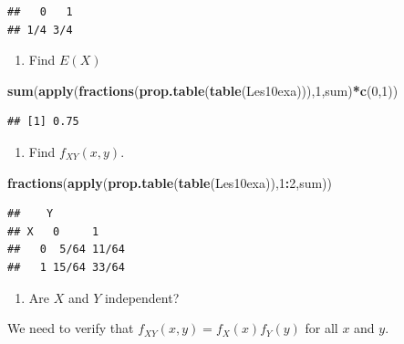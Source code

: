 \documentclass[]{book}
\newenvironment{Shaded}{\begin{snugshade}}{\end{snugshade}}
\newcommand{\KeywordTok}[1]{\textcolor[rgb]{0.13,0.29,0.53}{\textbf{#1}}}
\newcommand{\DecValTok}[1]{\textcolor[rgb]{0.00,0.00,0.81}{#1}}
\newcommand{\OperatorTok}[1]{\textcolor[rgb]{0.81,0.36,0.00}{\textbf{#1}}}
\newcommand{\NormalTok}[1]{#1}
\providecommand{\tightlist}{%
  \setlength{\itemsep}{0pt}\setlength{\parskip}{0pt}}
\theoremstyle{definition}
\theoremstyle{definition}
\theoremstyle{definition}
\theoremstyle{remark}
\begin{document}
\begin{verbatim}
##   0   1 
## 1/4 3/4
\end{verbatim}

\begin{enumerate}
\def\labelenumi{\arabic{enumi}.}
\setcounter{enumi}{2}
\tightlist
\item
  Find \(E(X)\)
\end{enumerate}

\begin{Shaded}
\begin{Highlighting}[]
\KeywordTok{sum}\NormalTok{(}\KeywordTok{apply}\NormalTok{(}\KeywordTok{fractions}\NormalTok{(}\KeywordTok{prop.table}\NormalTok{(}\KeywordTok{table}\NormalTok{(Les10exa))),}\DecValTok{1}\NormalTok{,sum)}\OperatorTok{*}\KeywordTok{c}\NormalTok{(}\DecValTok{0}\NormalTok{,}\DecValTok{1}\NormalTok{))}
\end{Highlighting}
\end{Shaded}

\begin{verbatim}
## [1] 0.75
\end{verbatim}

\begin{enumerate}
\def\labelenumi{\arabic{enumi}.}
\setcounter{enumi}{3}
\tightlist
\item
  Find \(f_{XY}(x,y)\).
\end{enumerate}

\begin{Shaded}
\begin{Highlighting}[]
\KeywordTok{fractions}\NormalTok{(}\KeywordTok{apply}\NormalTok{(}\KeywordTok{prop.table}\NormalTok{(}\KeywordTok{table}\NormalTok{(Les10exa)),}\DecValTok{1}\OperatorTok{:}\DecValTok{2}\NormalTok{,sum))}
\end{Highlighting}
\end{Shaded}

\begin{verbatim}
##    Y
## X   0     1    
##   0  5/64 11/64
##   1 15/64 33/64
\end{verbatim}

\begin{enumerate}
\def\labelenumi{\arabic{enumi}.}
\setcounter{enumi}{4}
\tightlist
\item
  Are \(X\) and \(Y\) independent?
\end{enumerate}

We need to verify that \(f_{XY}(x,y)=f_{X}(x)f_{Y}(y)\) for all \(x\)
and \(y\).
\end{document}
